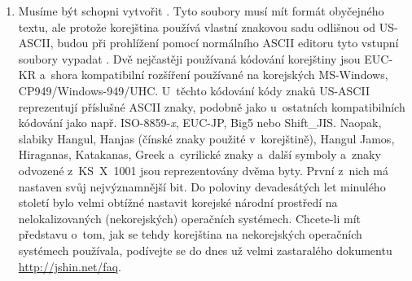 \begin{enumerate}
\item 
Musíme být schopni vytvořit . Tyto soubory musí mít
formát obyčejného textu, ale protože korejština používá vlastní znakovou
sadu odlišnou od US-ASCII, budou při prohlížení pomocí normálního ASCII
editoru tyto vstupní soubory vypadat . Dvě nejčastěji používaná
kódování korejštiny jsou EUC-KR a~shora kompatibilní rozšíření
používané na korejských MS-Windows, CP949/Windows-949/UHC. U~těchto
kódování kódy znaků US-ASCII reprezentují příslušné ASCII znaky,
podobně jako u~ostatních kompatibilních kódování jako např. 
ISO-8859-\textit{x}, EUC-JP, Big5 nebo Shift\_JIS. Naopak,
slabiky Hangul, Hanjas (čínské znaky použité v~korejštině), Hangul Jamos,
Hiraganas, Katakanas, Greek a~cyrilické znaky a~další symboly a~znaky
odvozené z~KS~X~1001 jsou reprezentovány dvěma byty. První z~nich má
nastaven svůj nejvýznamnější bit. Do poloviny devadesátých
let minulého století bylo velmi obtížné nastavit korejské národní prostředí
na nelokalizovaných (nekorejských) operačních systémech.
Chcete-li mít představu o~tom, jak se tehdy
korejština na nekorejských operačních systémech používala, podívejte
se do dnes už velmi zastaralého dokumentu \url{http://jshin.net/faq}.


\end{enumerate}
